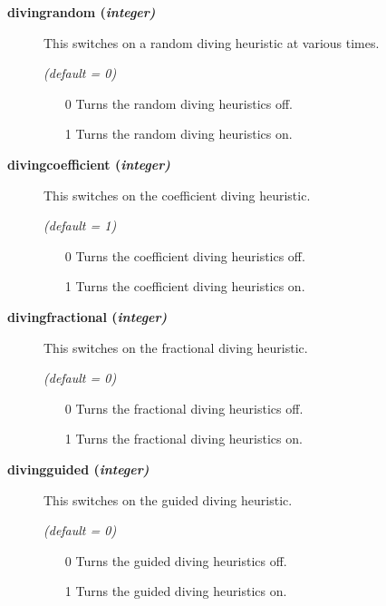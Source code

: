 \begin{description}
\item[\label{divingrandom}\hypertarget{divingrandom}
{\textbf{divingrandom (\slshape{integer})}}]\hspace{1.0in}

This switches on a random diving heuristic at various times.

\textsl{(default = 0)}
\begin{itemize}
\item[0]
Turns the random diving heuristics off.
\item[1]
Turns the random diving heuristics on.
\end{itemize}

\item[\label{divingcoefficient}\hypertarget{divingcoefficient}
{\textbf{divingcoefficient (\slshape{integer})}}]\hspace{1.0in}

This switches on the coefficient diving heuristic.

\textsl{(default = 1)}
\begin{itemize}
\item[0]
Turns the coefficient diving heuristics off.
\item[1]
Turns the coefficient diving heuristics on.
\end{itemize}

\item[\label{divingfractional}\hypertarget{divingfractional}
{\textbf{divingfractional (\slshape{integer})}}]\hspace{1.0in}

This switches on the fractional diving heuristic.

\textsl{(default = 0)}
\begin{itemize}
\item[0]
Turns the fractional diving heuristics off.
\item[1]
Turns the fractional diving heuristics on.
\end{itemize}

\item[\label{divingguided}\hypertarget{divingguided}
{\textbf{divingguided (\slshape{integer})}}]\hspace{1.0in}

This switches on the guided diving heuristic.

\textsl{(default = 0)}
\begin{itemize}
\item[0]
Turns the guided diving heuristics off.
\item[1]
Turns the guided diving heuristics on.
\end{itemize}


\end{description}

